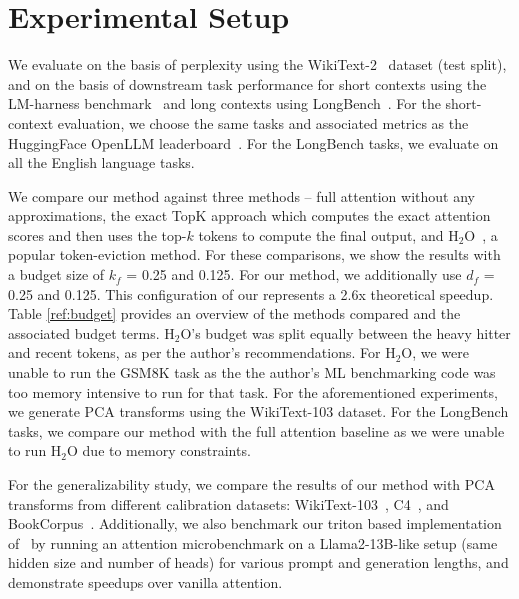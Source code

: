 \section{Experimental Setup}
\label{sec:setup}
We evaluate \method on the basis of 
perplexity using the WikiText-2~\citep{wikitext-103} dataset (test split), and on the basis of downstream task performance for  
short contexts using the LM-harness
benchmark~\citep{eval-harness} and long contexts
using LongBench~\citep{bai2023longbench}. For the short-context evaluation, we
choose the same tasks and associated metrics as the HuggingFace OpenLLM
leaderboard~\citep{open-llm-leaderboard}. For the LongBench tasks, we evaluate
on all the English language tasks. 

We compare our method against three methods -- full attention without any
approximations, the exact TopK approach which computes the exact attention
scores and then uses the top-$k$ tokens to compute the final output, and
H$_2$O~\citep{zhang2023hH2O}, a popular token-eviction method. For these
comparisons, we show the results with a budget size of $k_f$ = 0.25 and 0.125.
For our method, we additionally use $d_f$ = 0.25 and 0.125. This configuration
of our represents a 2.6x theoretical speedup. Table \ref{ref:budget} provides
an overview of the methods compared and the associated budget terms. H$_2$O's
budget was split equally between the heavy hitter and recent tokens, as per the
author's recommendations. For H$_2$O, we were unable to run the GSM8K task as
the the author's ML benchmarking code was too memory intensive to run for that
task. For the aforementioned experiments, we generate PCA transforms using the
WikiText-103 dataset. For the LongBench tasks, we compare our method with the
full attention baseline as we were unable to run H$_2$O due to memory
constraints. 

For the generalizability study, we compare the results of our method with PCA
transforms from different calibration datasets:
WikiText-103~\citep{wikitext-103}, C4~\citep{raffel2023exploring}, and
BookCorpus~\citep{zhu2015aligning}. Additionally, we also benchmark our triton
based implementation of \method~by running an attention microbenchmark on a
Llama2-13B-like setup (same hidden size and number of heads) for various prompt
and generation lengths, and demonstrate speedups over vanilla attention.

